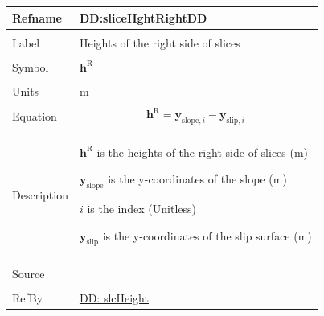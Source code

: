 \documentclass[12pt]{article}
\begin{document}
\noindent \begin{minipage}{\textwidth}
\begin{tabular}{>{\raggedright}p{}>{\raggedright\arraybackslash}p{}}
\toprule \textbf{Refname} & \textbf{DD:sliceHghtRightDD}
\label{DD:sliceHghtRightDD}
\\ \midrule \\
Label & Heights of the right side of slices
\\ \midrule \\
Symbol & ${\mathbf{h}^{\text{R}}}$
\\ \midrule \\
Units & m
\\ \midrule \\
Equation & \begin{displaymath}
           {\mathbf{h}^{\text{R}}}={\mathbf{y}_{\text{slope},i}}-{\mathbf{y}_{\text{slip},i}}
           \end{displaymath}
\\ \midrule \\
Description & \begin{symbDescription}
              \item{${\mathbf{h}^{\text{R}}}$ is the heights of the right side of slices (m)}
              \item{${\mathbf{y}_{\text{slope}}}$ is the y-coordinates of the slope (m)}
              \item{$i$ is the index (Unitless)}
              \item{${\mathbf{y}_{\text{slip}}}$ is the y-coordinates of the slip surface (m)}
              \end{symbDescription}
\\ \midrule \\
Source & \cite{fredlund1977}
\\ \midrule \\
RefBy & \hyperref[DD:slcHeight]{DD: slcHeight}
\\ \bottomrule
\end{tabular}
\end{minipage}
\par~
\end{document}
